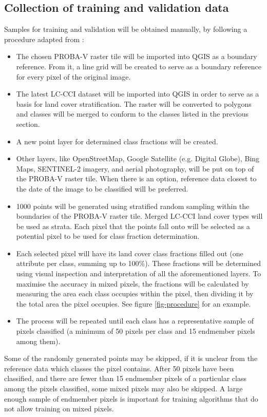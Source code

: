 \documentclass[a4paper,10pt]{article}
\begin{document}
\subsection{Collection of training and validation data}

Samples for training and validation will be obtained manually, by following a procedure adapted from \citep{defries1998training}:
\begin{itemize}
 \item The chosen PROBA-V raster tile will be imported into QGIS as a boundary reference. From it, a line grid will be created to serve as a boundary reference for every pixel of the original image.
 \item The latest LC-CCI dataset will be imported into QGIS in order to serve as a basis for land cover stratification. The raster will be converted to polygons and classes will be merged to conform to the classes listed in the previous section.
 \item A new point layer for determined class fractions will be created.
 \item Other layers, like OpenStreetMap, Google Satellite (e.g. Digital Globe), Bing Maps, SENTINEL-2 imagery, and aerial photography, will be put on top of the PROBA-V raster tile. When there is an option, reference data closest to the date of the image to be classified will be preferred.
 \item 1000 points will be generated using stratified random sampling within the boundaries of the PROBA-V raster tile. Merged LC-CCI land cover types will be used as strata. Each pixel that the points fall onto will be selected as a potential pixel to be used for class fraction determination.
 \item Each selected pixel will have its land cover class fractions filled out (one attribute per class, summing up to 100\%). These fractions will be determined using visual inspection and interpretation of all the aforementioned layers. To maximise the accuracy in mixed pixels, the fractions will be calculated by measuring the area each class occupies within the pixel, then dividing it by the total area the pixel occupies. See figure \ref{fig-procedure} for an example.
 \item The process will be repeated until each class has a representative sample of pixels classified (a minimum of 50 pixels per class and 15 endmember pixels among them).
\end{itemize}

Some of the randomly generated points may be skipped, if it is unclear from the reference data which classes the pixel contains. After 50 pixels have been classified, and there are fewer than 15 endmember pixels of a particular class among the pixels classified, some mixed pixels may also be skipped. A large enough sample of endmember pixels is important for training algorithms that do not allow training on mixed pixels.
\end{document}
